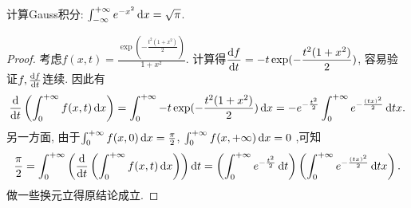 \begin{example}
	计算Gauss积分: $\int_{-\infty}^{+\infty} e^{-x^2} \mathop{}\!\mathrm{d} x = \sqrt{\pi}$. 
\end{example}
\begin{proof}
	考虑$\displaystyle f(x,t) = \frac{\exp (-\frac{t^2(1+x^2)}{2})}{1+x^2} $. 计算得$\displaystyle \frac{\mathop{}\!\mathrm{d} f}{\mathop{}\!\mathrm{d} t} = -t\exp (-\frac{t^2(1+x^2)}{2})$, 容易验证$f,\frac{\mathop{}\!\mathrm{d} f}{\mathop{}\!\mathrm{d} t}$连续. 因此有$$\frac{\mathop{}\!\mathrm{d}}{\mathop{}\!\mathrm{d} t} \left( \int_0^{+\infty} f(x,t) \mathop{}\!\mathrm{d} x \right) = \int_0^{+\infty} -t\exp (-\frac{t^2(1+x^2)}{2}) \mathop{}\!\mathrm{d} x = -e^{-\frac{t^2}{2}}\int_0^{+\infty} e^{-\frac{(tx)^2}{2}} \mathop{}\!\mathrm{d} tx.$$
	另一方面, 由于$\int_0^{+\infty} f(x,0) \mathop{}\!\mathrm{d} x = \frac{\pi}{2}$, $\int_0^{+\infty} f(x,+\infty) \mathop{}\!\mathrm{d} x = 0$ ,可知$$\frac{\pi}{2} = \int_0^{+\infty} \left( \frac{\mathop{}\!\mathrm{d}}{\mathop{}\!\mathrm{d} t} \left( \int_0^{+\infty} f(x,t) \mathop{}\!\mathrm{d} x \right) \right) \mathop{}\!\mathrm{d} t = \left(\int_0^{+\infty} e^{-\frac{t^2}{2}} \mathop{}\!\mathrm{d} t \right) \left( \int_0^{+\infty} e^{-\frac{(tx)^2}{2}} \mathop{}\!\mathrm{d} tx \right).$$
	做一些换元立得原结论成立. 
\end{proof}




